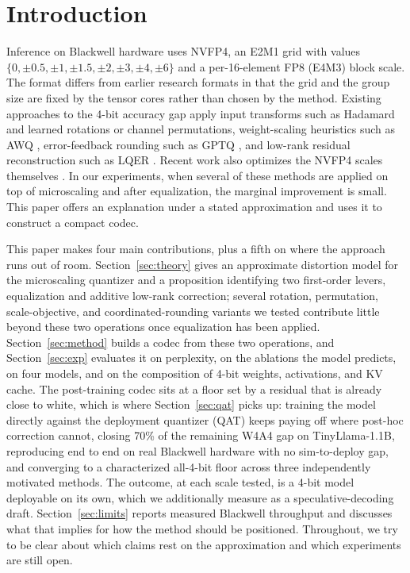\documentclass[11pt]{article}
\begin{document}
\section{Introduction}
Inference on Blackwell hardware uses NVFP4, an E2M1 grid with values
$\{0,\pm0.5,\pm1,\pm1.5,\pm2,\pm3,\pm4,\pm6\}$ and a per-16-element FP8 (E4M3) block
scale. The format differs from earlier research formats in that the grid and the group
size are fixed by the tensor cores rather than chosen by the method. Existing
approaches to the 4-bit accuracy gap apply input transforms such as Hadamard
\cite{ashkboos2024quarot} and learned rotations \cite{liu2024spinquant} or channel
permutations, weight-scaling heuristics such as AWQ \cite{lin2024awq}, error-feedback
rounding such as GPTQ \cite{frantar2022gptq}, and low-rank residual reconstruction such
as LQER \cite{zhang2024lqer}. Recent work also optimizes the NVFP4 scales themselves
\cite{soar2026,fouroversix2025,scalesearch2026}. In our experiments, when several of these methods are
applied on top of microscaling and after equalization, the marginal improvement is
small. This paper offers an explanation under a stated approximation and uses it to
construct a compact codec.

This paper makes four main contributions, plus a fifth on where the approach runs out
of room. Section~\ref{sec:theory} gives an approximate distortion model for the
microscaling quantizer and a proposition identifying two first-order levers,
equalization and additive low-rank correction; several rotation, permutation,
scale-objective, and coordinated-rounding variants we tested contribute little beyond
these two operations once equalization has been applied. Section~\ref{sec:method}
builds a codec from these two operations, and Section~\ref{sec:exp} evaluates it on
perplexity, on the ablations the model predicts, on four models, and on the composition
of 4-bit weights, activations, and KV cache. The post-training codec sits at a floor set
by a residual that is already close to white, which is where Section~\ref{sec:qat}
picks up: training the model directly against the deployment quantizer (QAT) keeps
paying off where post-hoc correction cannot, closing 70\% of the remaining W4A4 gap on
TinyLlama-1.1B, reproducing end to end on real Blackwell hardware with no
sim-to-deploy gap, and converging to a characterized all-4-bit floor across three
independently motivated methods. The outcome, at each scale tested, is a 4-bit model
deployable on its own, which we additionally measure as a speculative-decoding draft.
Section~\ref{sec:limits} reports measured Blackwell throughput and discusses what that
implies for how the method should be positioned. Throughout, we try to be clear about
which claims rest on the approximation and which experiments are still open.
\end{document}
